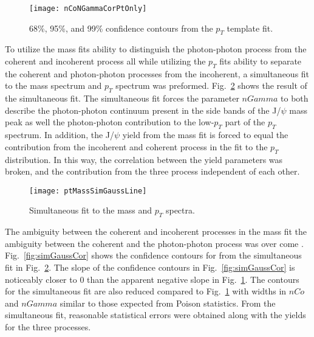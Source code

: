     \begin{figure}[!Hhbt]
      \centering
      \texttt{[image: nCoNGammaCorPtOnly]}
      \caption{68\%, 95\%, and 99\% confidence contours from the $p_{T}$ 
        template fit. }
      \label{fig:ptOnlyCor}
    \end{figure}

    To utilize the mass fits ability to distinguish the photon-photon process 
      from the coherent and incoherent process all while utilizing the $p_{T}$
      fits ability to separate the coherent and photon-photon processes from 
      the incoherent, a simultaneous fit to the mass spectrum and $p_{T}$ 
      spectrum was preformed.
    Fig.~\ref{fig:simFitMassPtGauss} shows the result of the simultaneous fit.
    The simultaneous fit forces the parameter $nGamma$ to both describe the 
      photon-photon continuum present in the side bands of the J/$\psi$ mass 
      peak as well the photon-photon contribution to the low-$p_{T}$ part of 
      the $p_{T}$ spectrum.
    In addition, the J/$\psi$ yield from the mass fit is forced to equal the
      contribution from \DIFdelbegin {}\DIFdelend the incoherent and coherent process in the 
      fit to the $p_{T}$ distribution. 
    In this way, the correlation between the yield parameters was broken, and 
      the contribution from the three process \DIFdelbegin {}\DIFdelend \DIFaddbegin {}\DIFaddend independent of each 
      other.

    \begin{figure}[!Hhbt]
      \centering
      \texttt{[image: ptMassSimGaussLine]}
      \caption{Simultaneous fit to the mass and $p_{T}$ spectra.}
      \label{fig:simFitMassPtGauss}
    \end{figure}

    \DIFdelbegin {}\DIFdelend The ambiguity between the coherent and incoherent processes in the mass fit
      \DIFaddbegin {}\DIFaddend the ambiguity between the coherent and the photon-photon process was 
      over come \DIFdelbegin {}\DIFdelend \DIFaddbegin {}\DIFaddend .
    Fig.~\ref{fig:simGaussCor} shows the confidence contours for \DIFdelbegin {}\DIFdelend \DIFaddbegin {}\DIFaddend from the simultaneous fit in Fig.~\ref{fig:simFitMassPtGauss}.  
    The slope of the confidence contours in Fig.~\ref{fig:simGaussCor} 
      is noticeably closer to 0 than the apparent negative slope in 
      Fig.~\ref{fig:ptOnlyCor}.
    The contours for the simultaneous fit are also reduced compared to 
      Fig.~\ref{fig:ptOnlyCor} with widths in $nCo$ and $nGamma$ similar to 
      those expected from Poison statistics. 
    From the simultaneous fit, reasonable statistical errors were obtained 
      along with the yields for the three processes. 

